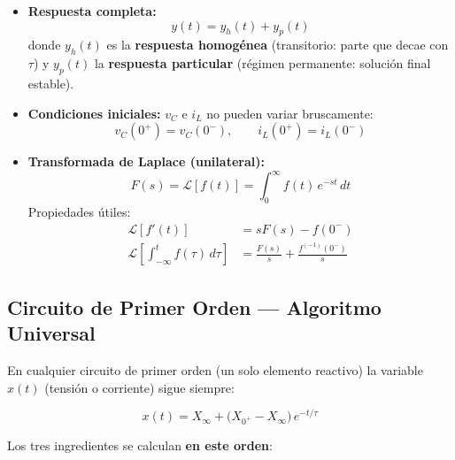 \documentclass[12pt,a4paper]{article}
\begin{document}
\begin{itemize}[leftmargin=1.5em, itemsep=4pt]

  \item \textbf{Respuesta completa:}
  \[
    y(t) = y_h(t) + y_p(t)
  \]
  donde $y_h(t)$ es la \textbf{respuesta homogénea} (transitorio: parte que decae con $\tau$) y $y_p(t)$ la
  \textbf{respuesta particular} (régimen permanente: solución final estable).

  \item \textbf{Condiciones iniciales:} $v_C$ e $i_L$ no pueden variar bruscamente:
  \[
    v_C(0^+) = v_C(0^-), \qquad i_L(0^+) = i_L(0^-)
  \]

  \item \textbf{Transformada de Laplace (unilateral):}
  \[
    F(s) = \mathcal{L}[f(t)] = \int_0^\infty f(t)\,e^{-st}\,dt
  \]
  Propiedades útiles:
  \begin{align*}
    \mathcal{L}[f'(t)] &= sF(s) - f(0^-)\\
    \mathcal{L}\!\left[\int_{-\infty}^t f(\tau)\,d\tau\right] &= \frac{F(s)}{s}
      + \frac{f^{(-1)}(0^-)}{s}
  \end{align*}
\end{itemize}
\clearpage %

\subsection{Circuito de Primer Orden — Algoritmo Universal}

En cualquier circuito de primer orden (un solo elemento reactivo) la variable $x(t)$
(tensión o corriente) sigue siempre:

\begin{formulabox}
\[
  \boxed{x(t) = X_\infty + \bigl(X_{0^+} - X_\infty\bigr)\,e^{-t/\tau}}
\]
\end{formulabox}

Los tres ingredientes se calculan \textbf{en este orden}:
\end{document}
